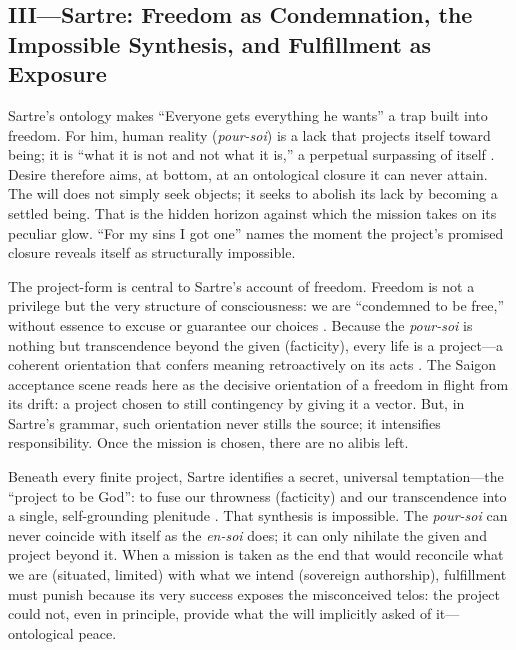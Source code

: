 \subsection*{III—Sartre: Freedom as Condemnation, the Impossible Synthesis, and Fulfillment as
	Exposure}
\label{ssec:iii-sartre}
Sartre's ontology makes ``Everyone gets everything he wants'' a trap built into freedom. For
him, human reality (\emph{pour-soi}) is a lack that projects itself toward being; it is ``what
it is not and not what it is,'' a perpetual surpassing of itself
\parencite[pp.~100--110]{SartreBN2003}. Desire therefore aims, at bottom, at an ontological
closure it can never attain. The will does not simply seek objects; it seeks to abolish its
lack by becoming a settled being. That is the hidden horizon against which the mission takes on
its peculiar glow. ``For my sins I got one'' names the moment the project's promised closure
reveals itself as structurally impossible.

The project-form is central to Sartre's account of freedom. Freedom is not a privilege but the
very structure of consciousness: we are ``condemned to be free,'' without essence to excuse or
guarantee our choices \parencite[pp.~34--36]{SartreBN2003}. Because the \emph{pour-soi} is
nothing but transcendence beyond the given (facticity), every life is a project—a coherent
orientation that confers meaning retroactively on its acts
\parencite[pp.~561--569]{SartreBN2003}. The Saigon acceptance scene reads here as the decisive
orientation of a freedom in flight from its drift: a project chosen to still contingency by
giving it a vector. But, in Sartre's grammar, such orientation never stills the source; it
intensifies responsibility. Once the mission is chosen, there are no alibis left.

Beneath every finite project, Sartre identifies a secret, universal temptation—the ``project to
be God'': to fuse our throwness (facticity) and our transcendence into a single, self-grounding
plenitude \parencite[pp.~586--604]{SartreBN2003}. That synthesis is impossible. The
\emph{pour-soi} can never coincide with itself as the \emph{en-soi} does; it can only nihilate
the given and project beyond it. When a mission is taken as the end that would reconcile what
we are (situated, limited) with what we intend (sovereign authorship), fulfillment must punish
because its very success exposes the misconceived telos: the project could not, even in
principle, provide what the will implicitly asked of it—ontological peace.

